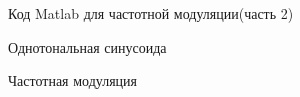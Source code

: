 \documentclass[12pt,a4paper]{scrartcl}
\begin{document}
\begin{figure}[h!]
\caption{Код Matlab для частотной модуляции(часть 2)}
\end{figure}

\begin{figure}[h!]
\caption{Однотональная синусоида}
\end{figure}

\begin{figure}[h!]
\caption{Частотная модуляция}
\end{figure}
\end{document}
